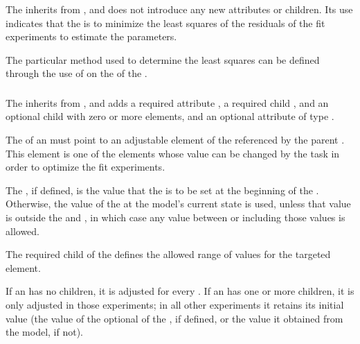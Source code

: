 \begin{blockChanged}
The \LeastSquareObjectiveFunction inherits from \Objective, and does not introduce any new attributes or children.  Its use indicates that the \ParameterEstimationTask is to minimize the least squares of the residuals of the fit experiments to estimate the parameters.

The particular method used to determine the least squares can be defined through the use of \AlgorithmParameters on the \Algorithm of the \ParameterEstimationTask.


\subsubsection{}
\label{class:adjustableParameter}
\label{class:listOfExperimentRefs}

The \AdjustableParameter inherits from \SedBase, and adds a required attribute  , a required child \Bounds, and an optional child \ListOfExperimentRefs with zero or more \ExperimentRef elements, and an optional attribute  of type .

The  of an \AdjustableParameter must point to an adjustable element of the \Model referenced by the parent \ParameterEstimationTask.  This element is one of the elements whose value can be changed by the task in order to optimize the fit experiments.


The , if defined, is the value that the \AdjustableParameter is to be set at the beginning of the \ParameterEstimationTask.  Otherwise, the value of the \AdjustableParameter at the model's current state is used, unless that value is outside the  and , in which case any value between or including those values is allowed.

The required \Bounds child of the \AdjustableParameter defines the allowed range of values for the targeted element.

If an \AdjustableParameter has no \ExperimentRef children, it is adjusted for every \FitExperiment.  If an \AdjustableParameter has one or more \ExperimentRef children, it is only adjusted in those experiments; in all other experiments it retains its initial value (the value of the optional  of the \AdjustableParameter, if defined, or the value it obtained from the model, if not).


\end{blockChanged}

